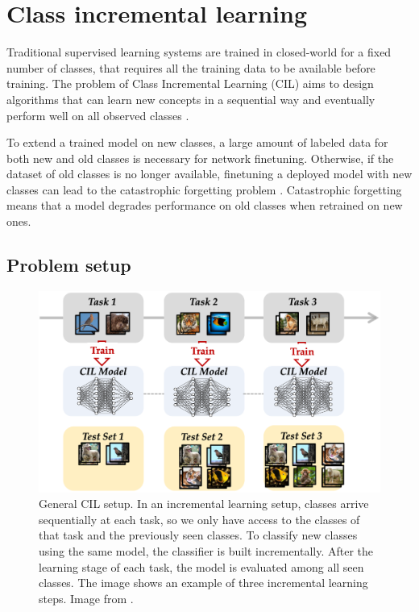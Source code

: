 \section{Class incremental learning}
Traditional supervised learning systems are trained in closed-world for a fixed
number of classes, that requires all the training data to be available before training.
The problem of Class Incremental Learning (CIL) aims to design algorithms that can learn new concepts in a sequential way and eventually perform well on all observed classes \cite{yan2021dynamically}.

To extend a trained model on new classes, a large amount of labeled data for both new
and old classes is necessary for network finetuning. Otherwise, if the dataset of old classes is no
longer available, finetuning a deployed model with
new classes can lead to the catastrophic forgetting
problem \cite{serra2018overcoming, zhang2021few, mccloskey1989catastrophic}. Catastrophic forgetting means that a model degrades performance on old classes when retrained on new ones.

\subsection{Problem setup}


\begin{figure}
    \begin{center}
        \includegraphics[width=0.9\columnwidth]{images/cil-setup.png}
    \end{center}
    \caption{General CIL setup. In an incremental learning setup, classes arrive sequentially at each task, so we only have access to the classes of that task and the previously seen classes. To classify new classes using the same model, the classifier is built incrementally. After the learning stage of each task, the model
    is evaluated among all seen classes. The image shows an example of three incremental learning steps. Image from \cite{zhou2021pycil}.}
    \label{fig:cil-setup}
\end{figure}

